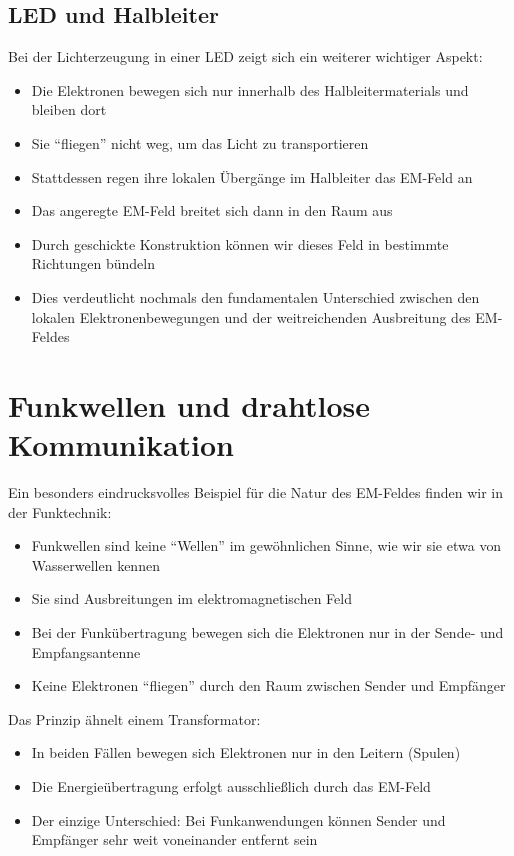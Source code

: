 \documentclass[12pt,a4paper]{article}
\begin{document}
	\subsection{LED und Halbleiter}
	Bei der Lichterzeugung in einer LED zeigt sich ein weiterer wichtiger Aspekt:
	\begin{itemize}
		\item Die Elektronen bewegen sich nur innerhalb des Halbleitermaterials und bleiben dort
		\item Sie ``fliegen'' nicht weg, um das Licht zu transportieren
		\item Stattdessen regen ihre lokalen Übergänge im Halbleiter das EM-Feld an
		\item Das angeregte EM-Feld breitet sich dann in den Raum aus
		\item Durch geschickte Konstruktion können wir dieses Feld in bestimmte Richtungen bündeln
		\item Dies verdeutlicht nochmals den fundamentalen Unterschied zwischen den lokalen Elektronenbewegungen und der weitreichenden Ausbreitung des EM-Feldes
	\end{itemize}
	
	\section{Funkwellen und drahtlose Kommunikation}
	Ein besonders eindrucksvolles Beispiel für die Natur des EM-Feldes finden wir in der Funktechnik:
	\begin{itemize}
		\item Funkwellen sind keine ``Wellen'' im gewöhnlichen Sinne, wie wir sie etwa von Wasserwellen kennen
		\item Sie sind Ausbreitungen im elektromagnetischen Feld
		\item Bei der Funkübertragung bewegen sich die Elektronen nur in der Sende- und Empfangsantenne
		\item Keine Elektronen ``fliegen'' durch den Raum zwischen Sender und Empfänger
	\end{itemize}
	
	Das Prinzip ähnelt einem Transformator:
	\begin{itemize}
		\item In beiden Fällen bewegen sich Elektronen nur in den Leitern (Spulen)
		\item Die Energieübertragung erfolgt ausschließlich durch das EM-Feld
		\item Der einzige Unterschied: Bei Funkanwendungen können Sender und Empfänger sehr weit voneinander entfernt sein
	\end{itemize}
	
\end{document}
